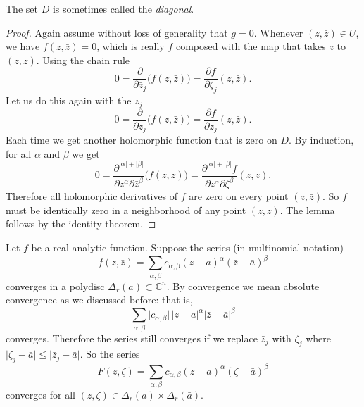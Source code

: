 \documentclass[12pt,openany]{book}
\newcommand{\sabs}[1]{\lvert {#1} \rvert}
\newcommand{\C}{{\mathbb{C}}}
\newcommand{\myindex}[1]{#1\index{#1}}
\theoremstyle{plain}
\theoremstyle{remark}
\theoremstyle{definition}
\theoremstyle{exercise}
\theoremstyle{example}
\begin{document}
The set $D$ is sometimes called the \emph{\myindex{diagonal}}.

\begin{proof}
Again assume without loss of generality that $g=0$.
Whenever $(z,\bar{z}) \in U$, we have $f(z,\bar{z}) = 0$, which is really
$f$ composed with the map that takes $z$ to $(z,\bar{z})$.  Using the chain rule
\begin{equation*}
0 =
\frac{\partial}{\partial \bar{z}_j} \bigl(f(z,\bar{z})\bigr)
=
\frac{\partial f}{\partial \zeta_j}(z,\bar{z}) .
\end{equation*}
Let us do this again with the $z_j$
\begin{equation*}
0 =
\frac{\partial}{\partial z_j} \bigl(f(z,\bar{z})\bigr)
=
\frac{\partial f}{\partial z_j}(z,\bar{z}) .
\end{equation*}
Each time we get another holomorphic function that is zero on $D$.
By induction, for all $\alpha$ and $\beta$ we get
\begin{equation*}
0 =
\frac{\partial^{\sabs{\alpha}+\sabs{\beta}}}{\partial z^\alpha \partial \bar{z}^\beta} \bigl(f(z,\bar{z})\bigr)
=
\frac{\partial^{\sabs{\alpha}+\sabs{\beta}} f}{\partial z^\alpha \partial
\zeta^\beta}(z,\bar{z}) .
\end{equation*}
Therefore all holomorphic derivatives of $f$ are zero on every point
$(z,\bar{z})$.  So $f$ must be identically zero in a neighborhood of any
point $(z,\bar{z})$.  The lemma follows by the identity
theorem.
\end{proof}

Let $f$ be a real-analytic function.  Suppose 
the series (in multinomial notation)
\begin{equation*}
f(z,\bar{z}) =
\sum_{\alpha,\beta} c_{\alpha,\beta} {(z-a)}^\alpha
{(\bar{z}-\bar{a})}^\beta
\end{equation*}
converges in a polydisc $\Delta_r(a) \subset \C^n$.
By convergence we mean absolute
convergence as we discussed before: that is,
\begin{equation*}
\sum_{\alpha,\beta} \sabs{c_{\alpha,\beta}} \, \sabs{z-a}^\alpha
\sabs{\bar{z}-\bar{a}}^\beta
\end{equation*}
converges.
Therefore the series still converges if we replace $\bar{z}_j$  with
$\zeta_j$ where $\sabs{\zeta_j-\bar{a}} \leq \sabs{\bar{z}_j-\bar{a}}$.
So the series
\begin{equation*}
F(z,\zeta) =
\sum_{\alpha,\beta} c_{\alpha,\beta} {(z-a)}^\alpha
{(\zeta-\bar{a})}^\beta
\end{equation*}
converges for all $(z,\zeta) \in \Delta_r(a) \times \Delta_r(\bar{a})$.
\end{document}
